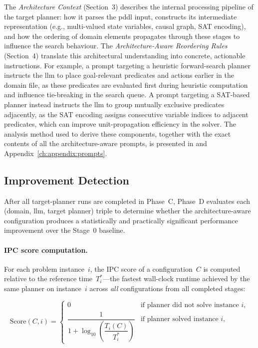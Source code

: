 The \emph{Architecture Context} (Section~3) describes the internal processing pipeline of the target planner: how it parses the \gls{pddl} input, constructs its intermediate representation (e.g., multi-valued state variables, causal graph, SAT encoding), and how the ordering of domain elements propagates through these stages to influence the search behaviour.
The \emph{Architecture-Aware Reordering Rules} (Section~4) translate this architectural understanding into concrete, actionable instructions.
For example, a prompt targeting a heuristic forward-search planner instructs the \gls{llm} to place goal-relevant predicates and actions earlier in the domain file, as these predicates are evaluated first during heuristic computation and influence tie-breaking in the search queue.
A prompt targeting a SAT-based planner instead instructs the \gls{llm} to group mutually exclusive predicates adjacently, as the SAT encoding assigns consecutive variable indices to adjacent predicates, which can improve unit-propagation efficiency in the solver.
The analysis method used to derive these components, together with the exact contents of all the architecture-aware prompts, is presented in  and Appendix~\ref{ch:appendix:prompts}.

\subsection{Improvement Detection}
\label{sec:design:stage2:improvement}

After all target-planner runs are completed in Phase~C, Phase~D evaluates each (domain, \gls{llm}, target planner) triple to determine whether the architecture-aware configuration produces a statistically and practically significant performance improvement over the Stage~0 baseline.

\paragraph{IPC score computation.}
For each problem instance~$i$, the IPC score of a configuration~$C$ is computed relative to the reference time~$T^*_i$---the fastest wall-clock runtime achieved by the same planner on instance~$i$ across \emph{all} configurations from all completed stages:

\begin{equation}\label{eq:ipc_score}
  \text{Score}(C, i) =
  \begin{cases}
    0 & \text{if planner did not solve instance } i, \\[4pt]
    \dfrac{1}{1 + \log_{10}\!\left(\dfrac{T_i(C)}{T^*_i}\right)} & \text{if planner solved instance } i,
  \end{cases}
\end{equation}

